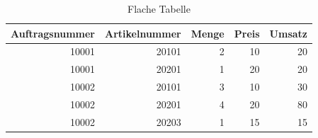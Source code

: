 \begin{table}[htbp]
  \centering
  \caption{Flache Tabelle}
  \label{tab:3-1}
  \begin{tabular}{rrrrr}
    \toprule
    Auftragsnummer & Artikelnummer & Menge & Preis & Umsatz \\
    \midrule
    10001 & 20101 & 2 & 10 & 20 \\
    10001 & 20201 & 1 & 20 & 20 \\
    10002 & 20101 & 3 & 10 & 30 \\
    10002 & 20201 & 4 & 20 & 80 \\
    10002 & 20203 & 1 & 15 & 15 \\
    \bottomrule
  \end{tabular}
\end{table}
